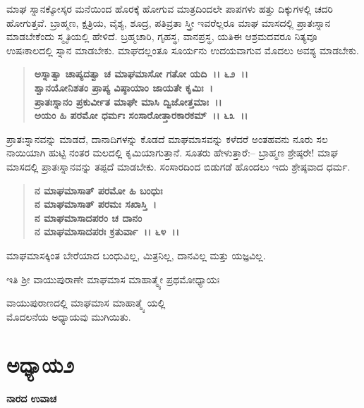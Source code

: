 ಮಾಘ ಸ್ನಾನಕ್ಕೋಸ್ಕರ ಮನೆಯಿಂದ ಹೊರಕ್ಕೆ ಹೋಗುವ ಮಾತ್ರದಿಂದಲೇ ಪಾಪಗಳು ಹತ್ತು ದಿಕ್ಕುಗಳಲ್ಲಿ ಚದರಿ ಹೋಗುತ್ತವೆ. ಬ್ರಾಹ್ಮಣ, ಕ್ಷತ್ರಿಯ, ವೈಶ್ಯ, ಶೂದ್ರ, ಪತಿವ್ರತಾ ಸ್ತ್ರೀ ಇವರೆಲ್ಲರೂ ಮಾಘ ಮಾಸದಲ್ಲಿ ಪ್ರಾತಃಸ್ನಾನ ಮಾಡಬೇಕೆಂದು ಸ್ಮೃತಿಯಲ್ಲಿ ಹೇಳಿದೆ. ಬ್ರಹ್ಮಚಾರಿ, ಗೃಹಸ್ಥ, ವಾನಪ್ರಸ್ಥ, ಯತಿಈ ಆಶ್ರಮದವರೂ ನಿತ್ಯವೂ ಉಷಃಕಾಲದಲ್ಲಿ ಸ್ನಾನ ಮಾಡಬೇಕು. ಮಾಘದಲ್ಲಂತೂ ಸೂರ್ಯನು ಉದಯವಾಗುವ ಮೊದಲು ಅವಶ್ಯ ಮಾಡಬೇಕು.

\begin{verse}
\textbf{ಅಸ್ನಾತ್ವಾ ಚಾಪ್ಯದತ್ವಾ ಚ ಮಾಘಮಾಸೋ ಗತೋ ಯದಿ~।। ೬೨~।।}\\\textbf{ಶ್ವಾನಯೋನಿಶತಂ ಪ್ರಾಪ್ಯ ವಿಷ್ಠಾಯಾಂ ಜಾಯತೇ ಕೃಮಿಃ~।}\\\textbf{ಪ್ರಾತಃಸ್ನಾನಂ ಪ್ರಕುರ್ವೀತ ಮಾಘೇ ಮಾಸಿ ದ್ವಿಜೋತ್ತಮಾಃ~।।} \\\textbf{ಅಯಂ ಹಿ ಪರಮೋ ಧರ್ಮಃ ಸಂಸಾರೋತ್ತಾರಕಾರಕಮ್~।। ೬೩~।।}
\end{verse}

ಪ್ರಾತಃಸ್ನಾನವನ್ನು ಮಾಡದೆ, ದಾನಾದಿಗಳನ್ನು ಕೊಡದೆ ಮಾಘಮಾಸವನ್ನು ಕಳೆದರೆ ಅಂತಹವನು ನೂರು ಸಲ ನಾಯಿಯಾಗಿ ಹುಟ್ಟಿ ನಂತರ ಮಲದಲ್ಲಿ ಕೃಮಿಯಾಗುತ್ತಾನೆ. ಸೂತರು ಹೇಳುತ್ತಾರೆ:– ಬ್ರಾಹ್ಮಣ ಶ್ರೇಷ್ಠರೇ! ಮಾಘ ಮಾಸದಲ್ಲಿ ಪ್ರಾತಃಸ್ನಾನವನ್ನು ತಪ್ಪದೆ ಮಾಡಬೇಕು. ಸಂಸಾರದಿಂದ ಬಿಡುಗಡೆ ಹೊಂದಲು ಇದು ಶ್ರೇಷ್ಠವಾದ ಧರ್ಮ.

\begin{verse}
\textbf{ನ ಮಾಘಮಾಸಾತ್ ಪರಮೋ ಹಿ ಬಂಧುಃ}\\\textbf{ನ ಮಾಘಮಾಸಾತ್ ಪರಮಃ ಸಖಾಸ್ತಿ~।}\\\textbf{ನ ಮಾಘಮಾಸಾದಪರಂ ಚ ದಾನಂ} \\\textbf{ನ ಮಾಘಮಾಸಾದಪರಃ ಕ್ರತುರ್ವಾ~।। ೬೪~।। }
\end{verse}

ಮಾಘಮಾಸಕ್ಕಿಂತ ಬೇರೆಯಾದ ಬಂಧುವಿಲ್ಲ, ಮಿತ್ರನಿಲ್ಲ, ದಾನವಿಲ್ಲ ಮತ್ತು ಯಜ್ಞವಿಲ್ಲ.

\begin{center}
ಇತಿ ಶ‍್ರೀ ವಾಯುಪುರಾಣೇ ಮಾಘಮಾಸ ಮಾಹಾತ್ಮ್ಯೇ ಪ್ರಥಮೋಧ್ಯಾಯಃ
\end{center}

\begin{center}
ವಾಯುಪುರಾಣದಲ್ಲಿ ಮಾಘಮಾಸ ಮಾಹಾತ್ಮ್ಯೆ ಯಲ್ಲಿ \\ ಮೊದಲನೆಯ ಅಧ್ಯಾಯವು ಮುಗಿಯಿತು.
\end{center}

\newpage

\section*{ಅಧ್ಯಾಯ೨}

\emptypage

\begin{flushleft}
\textbf{ನಾರದ ಉವಾಚ}
\end{flushleft}

